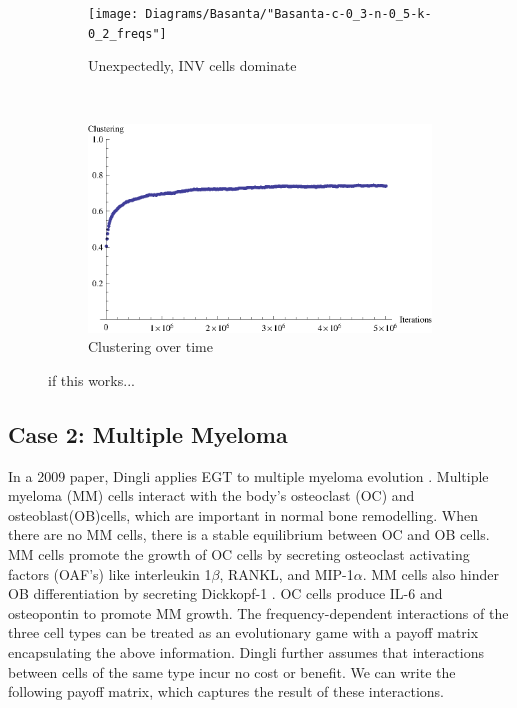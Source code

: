 \documentclass[12pt]{amsart}
\begin{document}
\begin{figure}[ht]
	\begin{subfigure}[b]{0.4 \linewidth}
		\texttt{[image: Diagrams/Basanta/"Basanta-c-0\_3-n-0\_5-k-0\_2\_freqs"]}
		\caption{Unexpectedly, INV cells dominate}
	\end{subfigure}
	~
	\begin{subfigure}[b]{0.4 \linewidth}
		\includegraphics[width = 0.9 \linewidth]{Diagrams/Basanta/Basanta1_clustering}
		\caption{Clustering over time}
	\end{subfigure}

\caption{if this works...}
\end{figure}

  	


\subsection{Case 2: Multiple Myeloma}
In a 2009 paper, Dingli applies EGT to multiple myeloma evolution \cite{Dingli2009}. Multiple myeloma (MM) cells interact with the body's osteoclast (OC) and osteoblast(OB)cells, which are important in normal bone remodelling. When there are no MM cells, there is a stable equilibrium between OC and OB cells. MM cells promote the growth of OC cells by secreting osteoclast activating factors (OAF's) like interleukin  1$\beta$, RANKL, and MIP-1$\alpha$. MM cells also hinder OB differentiation by secreting Dickkopf-1 \cite{Dingli2009}. OC cells produce IL-6 and osteopontin to promote MM growth. The frequency-dependent interactions of the three cell types can be treated as an evolutionary game with a payoff matrix encapsulating the above information. Dingli further assumes that interactions between cells of the same type incur no cost or benefit. We can write the following payoff matrix, which captures the result of these interactions. 
\end{document}
